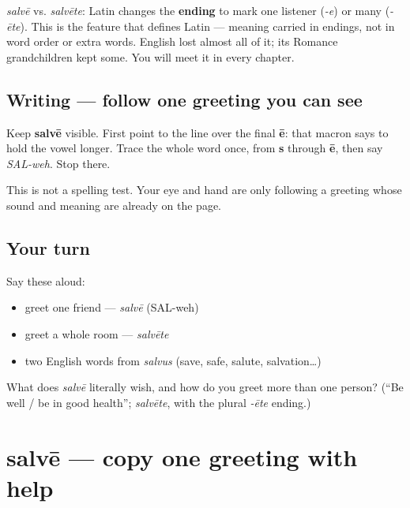 \begin{grammarlens}[title={Grammar Lens}]
\emph{salvē} vs. \emph{salvēte}: Latin changes the \textbf{ending} to mark one listener (\emph{-e}) or many (\emph{-ēte}). This is the feature that defines Latin — meaning carried in endings, not in word order or extra words. English lost almost all of it; its Romance grandchildren kept some. You will meet it in every chapter.
\end{grammarlens}

\subsection*{Writing — follow one greeting you can see}
Keep \textbf{salvē} visible. First point to the line over the final \textbf{ē}: that macron says to hold the vowel longer. Trace the whole word once, from \textbf{s} through \textbf{ē}, then say \emph{SAL-weh}. Stop there.

This is not a spelling test. Your eye and hand are only following a greeting whose sound and meaning are already on the page.

\subsection*{Your turn}
Say these aloud:

\begin{itemize}
\raggedright
  \item greet one friend — \emph{salvē} (SAL-weh)
  \item greet a whole room — \emph{salvēte}
  \item two English words from \emph{salvus} (save, safe, salute, salvation…)
\end{itemize}

\begin{tcolorbox}[breakable,colback=teal!4,colframe=teal!35!black,title={Before you move on}]
What does \emph{salvē} literally wish, and how do you greet more than one person? (\textquotedblleft{}Be well / be in good health\textquotedblright{}; \emph{salvēte}, with the plural \emph{-ēte} ending.)
\end{tcolorbox}
\section[salvē / salvēte]{salvē — copy one greeting with help}

\label{lesson:LA-W01-salve-guided-copy}



